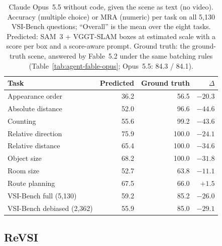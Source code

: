 \begin{table}[t]
\centering
\caption{Claude Opus~5.5 without code, given the scene as text (no video). Accuracy (multiple choice) or MRA
(numeric) per task on all 5,130 VSI-Bench questions; ``Overall'' is the mean over the eight tasks. Predicted:
SAM~3 + VGGT-SLAM boxes at estimated scale with a score per box and a score-aware prompt. Ground truth: the
ground-truth scene, answered by Fable~5.2 under the same batching rules (Table~\ref{tab:agent-fable-opus}; Opus~5.5:
84.3 / 84.1).}
\label{tab:claude-s3est}
\begin{tabular}{lrrr}
\toprule
Task & Predicted & Ground truth & $\Delta$ \\
\midrule
Appearance order   & 36.2 & 56.5  & $-20.3$ \\
Absolute distance  & 52.0 & 96.6  & $-44.6$ \\
Counting           & 55.6 & 99.2  & $-43.6$ \\
Relative direction & 75.9 & 100.0 & $-24.1$ \\
Relative distance  & 65.4 & 100.0 & $-34.6$ \\
Object size        & 68.2 & 100.0 & $-31.8$ \\
Room size          & 52.7 & 63.8  & $-11.1$ \\
Route planning     & 67.5 & 66.0  & $+1.5$ \\
\midrule
VSI-Bench full (5,130)     & 59.2 & 85.2 & $-26.0$ \\
VSI-Bench debiased (2,362) & 55.9 & 85.0 & $-29.1$ \\
\bottomrule
\end{tabular}
\end{table}

\subsection{ReVSI}
\label{sec:claude-revsi}


